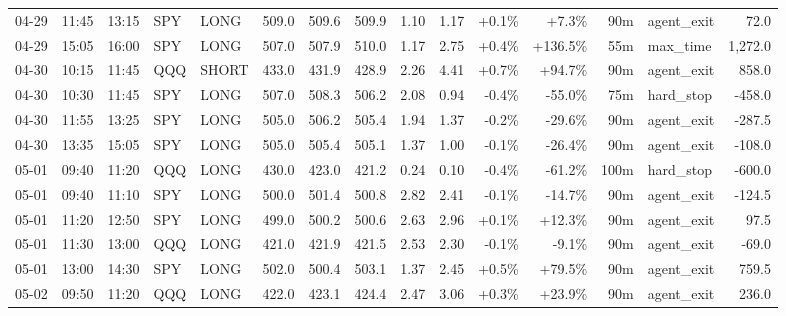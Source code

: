 \documentclass[11pt,a4paper,twoside]{article}
\begin{document}
\begin{landscape}
\begin{center}
\begin{longtable}{>{\color{txtmain}}l l l l l r r r r r r r r >{\color{txtmain}}l r}
04-29 & 11:45 & 13:15 & SPY & LONG & 509.0 & 509.6 & 509.9 & 1.10 & 1.17 & \textcolor{wingreen}{+0.1\%} & \textcolor{wingreen}{+7.3\%} & 90m & agent\_exit & \textcolor{wingreen}{72.0} \\
04-29 & 15:05 & 16:00 & SPY & LONG & 507.0 & 507.9 & 510.0 & 1.17 & 2.75 & \textcolor{wingreen}{+0.4\%} & \textcolor{wingreen}{+136.5\%} & 55m & max\_time & \textcolor{wingreen}{1,272.0} \\
04-30 & 10:15 & 11:45 & QQQ & SHORT & 433.0 & 431.9 & 428.9 & 2.26 & 4.41 & \textcolor{wingreen}{+0.7\%} & \textcolor{wingreen}{+94.7\%} & 90m & agent\_exit & \textcolor{wingreen}{858.0} \\
04-30 & 10:30 & 11:45 & SPY & LONG & 507.0 & 508.3 & 506.2 & 2.08 & 0.94 & \textcolor{lossred}{-0.4\%} & \textcolor{lossred}{-55.0\%} & 75m & hard\_stop & \textcolor{lossred}{-458.0} \\
04-30 & 11:55 & 13:25 & SPY & LONG & 505.0 & 506.2 & 505.4 & 1.94 & 1.37 & \textcolor{lossred}{-0.2\%} & \textcolor{lossred}{-29.6\%} & 90m & agent\_exit & \textcolor{lossred}{-287.5} \\
04-30 & 13:35 & 15:05 & SPY & LONG & 505.0 & 505.4 & 505.1 & 1.37 & 1.00 & \textcolor{lossred}{-0.1\%} & \textcolor{lossred}{-26.4\%} & 90m & agent\_exit & \textcolor{lossred}{-108.0} \\
05-01 & 09:40 & 11:20 & QQQ & LONG & 430.0 & 423.0 & 421.2 & 0.24 & 0.10 & \textcolor{lossred}{-0.4\%} & \textcolor{lossred}{-61.2\%} & 100m & hard\_stop & \textcolor{lossred}{-600.0} \\
05-01 & 09:40 & 11:10 & SPY & LONG & 500.0 & 501.4 & 500.8 & 2.82 & 2.41 & \textcolor{lossred}{-0.1\%} & \textcolor{lossred}{-14.7\%} & 90m & agent\_exit & \textcolor{lossred}{-124.5} \\
05-01 & 11:20 & 12:50 & SPY & LONG & 499.0 & 500.2 & 500.6 & 2.63 & 2.96 & \textcolor{wingreen}{+0.1\%} & \textcolor{wingreen}{+12.3\%} & 90m & agent\_exit & \textcolor{wingreen}{97.5} \\
05-01 & 11:30 & 13:00 & QQQ & LONG & 421.0 & 421.9 & 421.5 & 2.53 & 2.30 & \textcolor{lossred}{-0.1\%} & \textcolor{lossred}{-9.1\%} & 90m & agent\_exit & \textcolor{lossred}{-69.0} \\
05-01 & 13:00 & 14:30 & SPY & LONG & 502.0 & 500.4 & 503.1 & 1.37 & 2.45 & \textcolor{wingreen}{+0.5\%} & \textcolor{wingreen}{+79.5\%} & 90m & agent\_exit & \textcolor{wingreen}{759.5} \\
05-02 & 09:50 & 11:20 & QQQ & LONG & 422.0 & 423.1 & 424.4 & 2.47 & 3.06 & \textcolor{wingreen}{+0.3\%} & \textcolor{wingreen}{+23.9\%} & 90m & agent\_exit & \textcolor{wingreen}{236.0} \\

\end{longtable}
\end{center}
\end{landscape}
\end{document}
